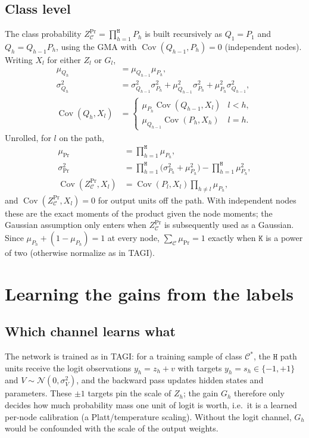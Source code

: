 \documentclass[letterpaper]{article}
\begin{document}
\subsection{Class level}
The class probability $Z^{\Pr}_{\mathcal C}=\prod_{h=1}^{\mathtt H}P_h$ is built recursively as $Q_1=P_1$ and $Q_h=Q_{h-1}P_h$, using the GMA with $\operatorname{Cov}(Q_{h-1},P_h)=0$ (independent nodes). Writing $X_l$ for either $Z_l$ or $G_l$,
\begin{align}
\mu_{Q_h}&=\mu_{Q_{h-1}}\mu_{P_h},\\
\sigma^2_{Q_h}&=\sigma^2_{Q_{h-1}}\sigma^2_{P_h}+\mu^2_{Q_{h-1}}\sigma^2_{P_h}+\mu^2_{P_h}\sigma^2_{Q_{h-1}},\\
\operatorname{Cov}(Q_h,X_l)&=\begin{cases}\mu_{P_h}\operatorname{Cov}(Q_{h-1},X_l)& l<h,\\ \mu_{Q_{h-1}}\operatorname{Cov}(P_h,X_h)& l=h.\end{cases}
\end{align}
Unrolled, for $l$ on the path,
\begin{equation}
\boxed{\;
\begin{aligned}
\mu_{\Pr}&=\prod_{h=1}^{\mathtt H}\mu_{P_h},\\
\sigma^2_{\Pr}&=\prod_{h=1}^{\mathtt H}\big(\sigma^2_{P_h}+\mu_{P_h}^2\big)-\prod_{h=1}^{\mathtt H}\mu_{P_h}^2,\\
\operatorname{Cov}(Z^{\Pr}_{\mathcal C},X_l)&=\operatorname{Cov}(P_l,X_l)\prod_{h\neq l}\mu_{P_h},
\end{aligned}\;}
\label{E:class}
\end{equation}
and $\operatorname{Cov}(Z^{\Pr}_{\mathcal C},X_l)=0$ for output units off the path. With independent nodes these are the exact moments of the product given the node moments; the Gaussian assumption only enters when $Z^{\Pr}_{\mathcal C}$ is subsequently used as a Gaussian. Since $\mu_{P_h}+(1-\mu_{P_h})=1$ at every node, $\sum_{\mathcal C}\mu_{\Pr}=1$ exactly when $\mathtt K$ is a power of two (otherwise normalize as in TAGI).

\section{Learning the gains from the labels}\label{S:cal}
\subsection{Which channel learns what}
The network is trained as in TAGI: for a training sample of class $\mathcal C^\ast$, the $\mathtt H$ path units receive the logit observations $y_h=z_h+v$ with targets $y_h=s_h\in\{-1,+1\}$ and $V\sim\mathcal N(0,\sigma_V^2)$, and the backward pass updates hidden states and parameters. These $\pm1$ targets pin the scale of $Z_h$; the gain $G_h$ therefore only decides how much probability mass one unit of logit is worth, i.e.\ it is a learned per-node calibration (a Platt/temperature scaling). Without the logit channel, $G_h$ would be confounded with the scale of the output weights.
\end{document}
